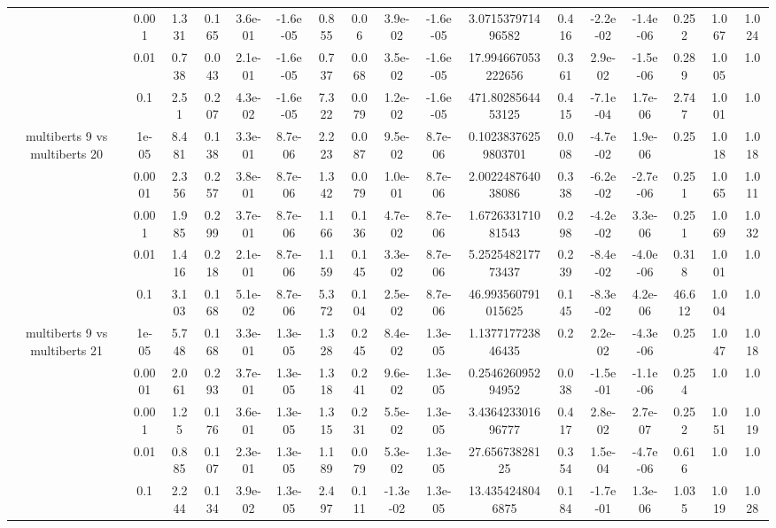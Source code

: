 \begin{tabular}{|c|c|c|c|c|c|c|c|c|c|c|c|c|c|c|c|c|}
 & 0.001 & 1.331 & 0.165 & 3.6e-01 & -1.6e-05 & 0.855 & 0.06 & 3.9e-02 & -1.6e-05 & 3.071537971496582 & 0.416 & -2.2e-02 & -1.4e-06 & 0.252 & 1.067 & 1.024 \\
 & 0.01 & 0.738 & 0.043 & 2.1e-01 & -1.6e-05 & 0.737 & 0.068 & 3.5e-02 & -1.6e-05 & 17.994667053222656 & 0.361 & 2.9e-02 & -1.5e-06 & 0.289 & 1.005 & 1.0 \\
 & 0.1 & 2.51 & 0.207 & 4.3e-02 & -1.6e-05 & 7.322 & 0.079 & 1.2e-02 & -1.6e-05 & 471.8028564453125 & 0.415 & -7.1e-04 & 1.7e-06 & 2.747 & 1.001 & 1.0 \\
\hline
\multirow{5}{*}{multiberts 9 vs multiberts 20} & 1e-05 & 8.481 & 0.138 & 3.3e-01 & 8.7e-06 & 2.223 & 0.087 & 9.5e-02 & 8.7e-06 & 0.10238376259803701 & 0.008 & -4.7e-02 & 1.9e-06 & 0.25 & 1.018 & 1.018 \\
 & 0.0001 & 2.356 & 0.257 & 3.8e-01 & 8.7e-06 & 1.342 & 0.079 & 1.0e-01 & 8.7e-06 & 2.002248764038086 & 0.338 & -6.2e-02 & -2.7e-06 & 0.251 & 1.065 & 1.011 \\
 & 0.001 & 1.985 & 0.299 & 3.7e-01 & 8.7e-06 & 1.166 & 0.136 & 4.7e-02 & 8.7e-06 & 1.672633171081543 & 0.298 & -4.2e-02 & 3.3e-06 & 0.251 & 1.069 & 1.032 \\
 & 0.01 & 1.416 & 0.218 & 2.1e-01 & 8.7e-06 & 1.159 & 0.145 & 3.3e-02 & 8.7e-06 & 5.252548217773437 & 0.239 & -8.4e-02 & -4.0e-06 & 0.318 & 1.001 & 1.0 \\
 & 0.1 & 3.103 & 0.168 & 5.1e-02 & 8.7e-06 & 5.372 & 0.104 & 2.5e-02 & 8.7e-06 & 46.993560791015625 & 0.145 & -8.3e-02 & 4.2e-06 & 46.612 & 1.004 & 1.0 \\
\hline
\multirow{5}{*}{multiberts 9 vs multiberts 21} & 1e-05 & 5.748 & 0.168 & 3.3e-01 & 1.3e-05 & 1.328 & 0.245 & 8.4e-02 & 1.3e-05 & 1.137717723846435 & 0.2 & 2.2e-02 & -4.3e-06 & 0.25 & 1.047 & 1.018 \\
 & 0.0001 & 2.061 & 0.293 & 3.7e-01 & 1.3e-05 & 1.318 & 0.241 & 9.6e-02 & 1.3e-05 & 0.254626095294952 & 0.038 & -1.5e-01 & -1.1e-06 & 0.254 & 1.0 & 1.0 \\
 & 0.001 & 1.25 & 0.176 & 3.6e-01 & 1.3e-05 & 1.315 & 0.231 & 5.5e-02 & 1.3e-05 & 3.436423301696777 & 0.417 & 2.8e-02 & 2.7e-07 & 0.252 & 1.051 & 1.019 \\
 & 0.01 & 0.885 & 0.107 & 2.3e-01 & 1.3e-05 & 1.189 & 0.079 & 5.3e-02 & 1.3e-05 & 27.65673828125 & 0.354 & 1.5e-04 & -4.7e-06 & 0.616 & 1.0 & 1.0 \\
 & 0.1 & 2.244 & 0.134 & 3.9e-02 & 1.3e-05 & 2.497 & 0.111 & -1.3e-02 & 1.3e-05 & 13.4354248046875 & 0.184 & -1.7e-01 & 1.3e-06 & 1.035 & 1.019 & 1.028 \\

\end{tabular}
